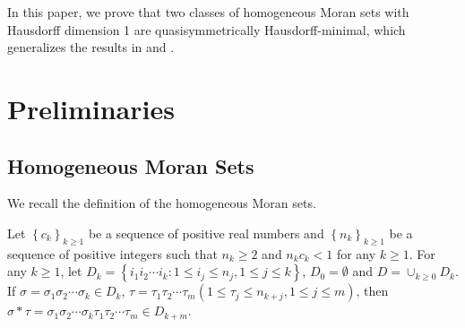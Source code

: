 \documentclass[reqno]{amsart}
\theoremstyle{plain}
\theoremstyle{definition}
\theoremstyle{remark}
\numberwithin{equation}{section} \DeclareMathOperator\intr{int}
\begin{document}
In this paper, we  prove that two classes of homogeneous Moran sets with Hausdorff dimension 1 are quasisymmetrically Hausdorff-minimal, which generalizes the results in  \cite{yjj18}  and \cite{XYQ}.


\bigskip

\section{Preliminaries}
\label{sec:pre}
\subsection{Homogeneous Moran Sets}
We recall the definition of the homogeneous Moran sets.

Let  $\left\{c_{k}\right\}_{k\ge1}$ be a sequence of positive real numbers and $\left\{n_{k}\right\}_{k\ge1}$ be a sequence of positive integers such that $n_k\ge 2$ and $n_kc_k<1$ for any $k\ge 1$.  For any $k\ge1$, let $D_{k}=\left\{i_{1}i_{2}\cdots i_{k}:1\le i_{j} \le n_{j},1\le j \le k\right\}$, $D_{0}=\emptyset$ and $D=\cup_{k\ge0}D_{k}$. If $\sigma=\sigma_{1}\sigma_{2}\cdots\sigma_{k}\in D_{k}$, $\tau=\tau_{1}\tau_{2}\cdots\tau_{m}(1\le \tau_j\le n_{k+j}, 1\le j \le m)$, then $\sigma*\tau =\sigma_{1}\sigma_{2}\cdots\sigma_{k}\tau_{1}\tau_{2}\cdots\tau_{m}\in D_{k+m}$.
\end{document}
